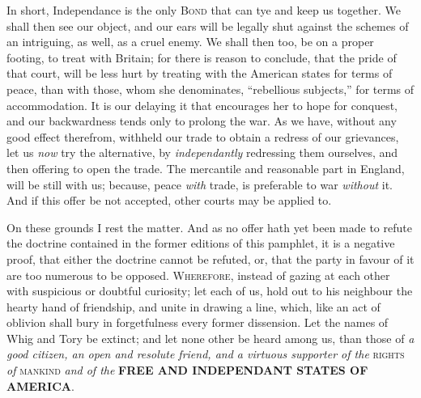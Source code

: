 \documentclass[12pt, twocolumn]{book}
\begin{document}
    In short, Independance is the only \textsc{Bond} that can tye and keep us together. We shall then see our object, and our ears will be legally shut against the schemes of an intriguing, as well, as a cruel enemy. We shall then too, be on a proper footing, to treat with Britain; for there is reason to conclude, that the pride of that court, will be less hurt by treating with the American states for terms of peace, than with those, whom she denominates, “rebellious subjects,” for terms of accommodation. It is our delaying it that encourages her to hope for conquest, and our backwardness tends only to prolong the war. As we have, without any good effect therefrom, withheld our trade to obtain a redress of our grievances, let us \textit{now} try the alternative, by \textit{independantly} redressing them ourselves, and then offering to open the trade. The mercantile and reasonable part in England, will be still with us; because, peace \textit{with} trade, is preferable to war \textit{without} it. And if this offer be not accepted, other courts may be applied to.

    On these grounds I rest the matter. And as no offer hath yet been made to refute the doctrine contained in the former editions of this pamphlet, it is a negative proof, that either the doctrine cannot be refuted, or, that the party in favour of it are too numerous to be opposed. \textsc{Wherefore}, instead of gazing at each other with suspicious or doubtful curiosity; let each of us, hold out to his neighbour the hearty hand of friendship, and unite in drawing a line, which, like an act of oblivion shall bury in forgetfulness every former dissension. Let the names of Whig and Tory be extinct; and let none other be heard among us, than those of \textit{a good citizen, an open and resolute friend, and a virtuous supporter of the} \textsc{rights} \textit{of} \textsc{mankind} \textit{and of the} \textbf{FREE AND INDEPENDANT STATES OF AMERICA}.
\end{document}
